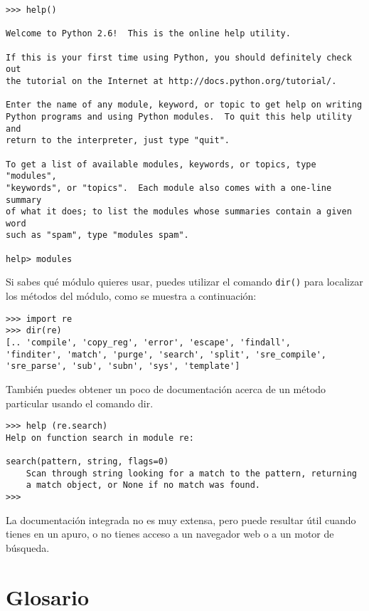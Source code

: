\beforeverb
\begin{verbatim}
>>> help()

Welcome to Python 2.6!  This is the online help utility.

If this is your first time using Python, you should definitely check out
the tutorial on the Internet at http://docs.python.org/tutorial/.

Enter the name of any module, keyword, or topic to get help on writing
Python programs and using Python modules.  To quit this help utility and
return to the interpreter, just type "quit".

To get a list of available modules, keywords, or topics, type "modules",
"keywords", or "topics".  Each module also comes with a one-line summary
of what it does; to list the modules whose summaries contain a given word
such as "spam", type "modules spam".

help> modules
\end{verbatim}
\afterverb
%
Si sabes qué módulo quieres usar, puedes utilizar el comando {\tt dir()} para localizar los métodos del módulo, como
se muestra a continuación:

\beforeverb
\begin{verbatim}
>>> import re
>>> dir(re)
[.. 'compile', 'copy_reg', 'error', 'escape', 'findall', 
'finditer', 'match', 'purge', 'search', 'split', 'sre_compile', 
'sre_parse', 'sub', 'subn', 'sys', 'template']
\end{verbatim}
\afterverb
%
También puedes obtener un poco de documentación acerca de un método particular usando el comando dir.

\beforeverb
\begin{verbatim}
>>> help (re.search)
Help on function search in module re:

search(pattern, string, flags=0)
    Scan through string looking for a match to the pattern, returning
    a match object, or None if no match was found.
>>> 
\end{verbatim}
\afterverb
%
La documentación integrada no es muy extensa, pero puede resultar útil cuando tienes en un apuro,
o no tienes acceso a un navegador web o a un motor de búsqueda.

\section{Glosario}

